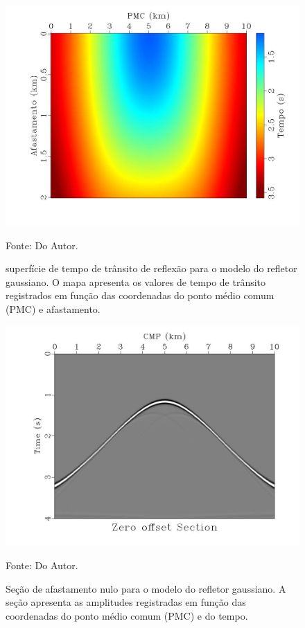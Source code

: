 \begin{figure}[htb]
\caption{superfície de tempo de trânsito de reflexão para o modelo do refletor gaussiano.
O mapa apresenta os valores de tempo de trânsito registrados em função das coordenadas do
ponto médio comum (PMC) e afastamento.}
\begin{center}
\includegraphics[scale=0.3]{images/reflectionSurface.jpeg}
\vspace{-0.3cm}
\end{center}
\begin{center}
 Fonte: Do Autor.
\end{center}
\label{fig:5.6}
\end{figure}

\begin{figure}[htb]
\caption{Seção de afastamento nulo para o modelo do refletor gaussiano.
A seção apresenta as amplitudes registradas em função das coordenadas do
ponto médio comum (PMC) e do tempo.}
\begin{center}
\includegraphics[scale=0.3]{images/zeroOffset.jpeg}
\vspace{-0.3cm}
\end{center}
\begin{center}
 Fonte: Do Autor.
\end{center}
\label{fig:5.7}
\end{figure}
